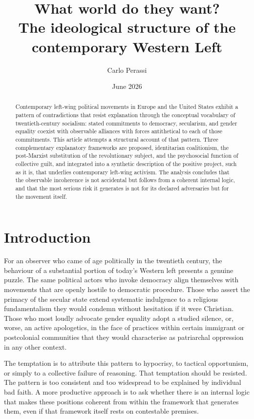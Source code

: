 \documentclass[12pt,a4paper]{article}
\title{What world do they want?\\
	\large The ideological structure of the contemporary Western Left}
\author{Carlo Perassi}
\date{June 2026}
\begin{document}
	
	\maketitle
	
	\begin{abstract}
		\noindent
		Contemporary left-wing political movements in Europe and the United States exhibit
		a pattern of contradictions that resist explanation through the conceptual vocabulary
		of twentieth-century socialism: stated commitments to democracy, secularism, and
		gender equality coexist with observable alliances with forces antithetical to each of
		those commitments. This article attempts a structural account of that pattern. Three
		complementary explanatory frameworks are proposed, identitarian coalitionism, the
		post-Marxist substitution of the revolutionary subject, and the psychosocial function
		of collective guilt, and integrated into a synthetic description of the positive
		project, such as it is, that underlies contemporary left-wing activism. The analysis
		concludes that the observable incoherence is not accidental but follows from a
		coherent internal logic, and that the most serious risk it generates is not for its
		declared adversaries but for the movement itself.
	\end{abstract}
	
	\section{Introduction}
	
	For an observer who came of age politically in the twentieth century, the behaviour
	of a substantial portion of today's Western left presents a genuine puzzle. The
	same political actors who invoke democracy align themselves with movements that
	are openly hostile to democratic procedure. Those who assert the primacy of the
	secular state extend systematic indulgence to a religious fundamentalism they would
	condemn without hesitation if it were Christian. Those who most loudly advocate
	gender equality adopt a studied silence, or, worse, an active apologetics, in the
	face of practices within certain immigrant or postcolonial communities that they
	would characterise as patriarchal oppression in any other context.
	
	The temptation is to attribute this pattern to hypocrisy, to tactical opportunism,
	or simply to a collective failure of reasoning. That temptation should be resisted.
	The pattern is too consistent and too widespread to be explained by individual
	bad faith. A more productive approach is to ask whether there is an internal logic
	that makes these positions coherent from within the framework that generates them,
	even if that framework itself rests on contestable premises.
	
\end{document}
